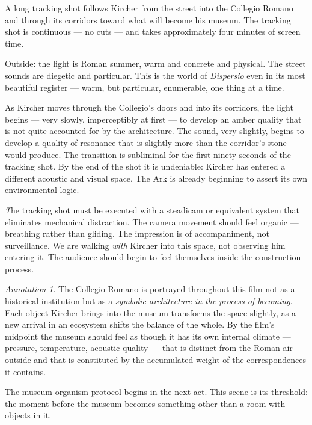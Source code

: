 \documentclass[12pt, a4paper, twoside]{memoir}
\theoremstyle{definition}
\theoremstyle{remark}
\newtheorem{annotation}{Annotation}[chapter]
\newenvironment{action}{%
  \vspace{4pt}%
  \noindent\begin{minipage}{\linewidth}%
  \setlength{\parindent}{0pt}%
  \itshape\color{kircherink}%
}{%
  \end{minipage}\vspace{6pt}%
}
\newenvironment{visual}{%
  \vspace{6pt}%
  \noindent\begin{mdframed}[
    linecolor=plaguegrey,
    linewidth=0.4pt,
    leftline=true, rightline=false, topline=false, bottomline=false,
    innerleftmargin=8pt,
    innerrightmargin=0pt,
    innertopmargin=2pt,
    innerbottommargin=2pt,
    backgroundcolor=white
  ]%
  \footnotesize\color{plaguegrey}\textit
}{%
  \end{mdframed}\vspace{4pt}%
}
\begin{document}
\begin{action}
A long tracking shot follows Kircher from the street into the Collegio Romano and through its corridors toward what will become his museum. The tracking shot is continuous --- no cuts --- and takes approximately four minutes of screen time.

Outside: the light is Roman summer, warm and concrete and physical. The street sounds are diegetic and particular. This is the world of \textit{Dispersio} even in its most beautiful register --- warm, but particular, enumerable, one thing at a time.

As Kircher moves through the Collegio's doors and into its corridors, the light begins --- very slowly, imperceptibly at first --- to develop an amber quality that is not quite accounted for by the architecture. The sound, very slightly, begins to develop a quality of resonance that is slightly more than the corridor's stone would produce. The transition is subliminal for the first ninety seconds of the tracking shot. By the end of the shot it is undeniable: Kircher has entered a different acoustic and visual space. The Ark is already beginning to assert its own environmental logic.
\end{action}

\begin{visual}
The tracking shot must be executed with a steadicam or equivalent system that eliminates mechanical distraction. The camera movement should feel organic --- breathing rather than gliding. The impression is of accompaniment, not surveillance. We are walking \textit{with} Kircher into this space, not observing him entering it. The audience should begin to feel themselves inside the construction process.
\end{visual}

\begin{annotation}
The Collegio Romano is portrayed throughout this film not as a historical institution but as a \textit{symbolic architecture in the process of becoming}. Each object Kircher brings into the museum transforms the space slightly, as a new arrival in an ecosystem shifts the balance of the whole. By the film's midpoint the museum should feel as though it has its own internal climate --- pressure, temperature, acoustic quality --- that is distinct from the Roman air outside and that is constituted by the accumulated weight of the correspondences it contains.

The museum organism protocol begins in the next act. This scene is its threshold: the moment before the museum becomes something other than a room with objects in it.
\end{annotation}
\end{document}
